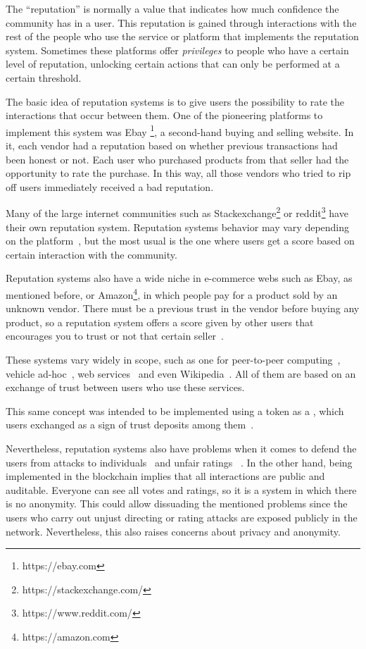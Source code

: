 The ``reputation'' is normally a value that indicates how much confidence the
community has in a user. This reputation is gained through interactions with the
rest of the people who use the service or platform that implements the
reputation system. Sometimes these platforms offer \emph{privileges} to people
who have a certain level of reputation, unlocking certain actions that can only
be performed at a certain threshold.

The basic idea of reputation systems is to give users the possibility to rate
the interactions that occur between them. One of the pioneering platforms to
implement this system was Ebay \footnote{https://ebay.com}, a second-hand buying
and selling website. In it, each vendor had a reputation based on whether
previous transactions had been honest or not. Each user who purchased products
from that seller had the opportunity to rate the purchase. In this way, all
those vendors who tried to rip off users immediately received a bad reputation.

Many of the large internet communities such as
Stackexchange\footnote{https://stackexchange.com/} or
reddit\footnote{https://www.reddit.com/} have their own reputation system.
Reputation systems behavior may vary depending on the
platform~\cite{josang2002beta}, but the most usual is the one where users get a
score based on certain interaction with the community.

Reputation systems also have a wide niche in e-commerce webs such as Ebay, as
mentioned before, or Amazon\footnote{https://amazon.com}, in which people pay
for a product sold by an unknown vendor. There must be a previous trust in the
vendor before buying any product, so a reputation system offers a score given by
other users that encourages you to trust or not that certain
seller~\cite{resnick2002trust}.

These systems vary widely in scope, such as one for peer-to-peer
computing~\cite{zhou2007powertrust}, vehicle ad-hoc~\cite{dotzer2005vars}, web
services~\cite{moore2008reputation} and even Wikipedia~\cite{adler2007content}.
All of them are based on an exchange of trust between users who use these
services.

This same concept was intended to be implemented using a token as a , which users exchanged as a sign of trust deposits among
them~\cite{sharples2016blockchain}.

Nevertheless, reputation systems also have problems when it comes to defend the
users from attacks to individuals~\cite{hoffman2009survey} and unfair ratings
~\cite{whitby2004filtering}. In the other hand, being implemented in the
blockchain implies that all interactions are public and auditable. Everyone can
see all votes and ratings, so it is a system in which there is no anonymity.
This could allow dissuading the mentioned problems since the users who carry out
unjust directing or rating attacks are exposed publicly in the network.
Nevertheless, this also raises concerns about privacy and anonymity.


